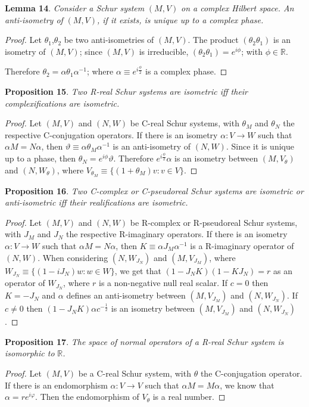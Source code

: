 \documentclass[11pt]{book}
\begin{document}
\textbf{Lemma 14}. \emph{Consider a Schur system }\((M,V)\)\emph{ on a
complex Hilbert space. An anti-isometry of }\((M,V)\)\emph{, if it
exists, is unique up to a complex phase.}

\emph{Proof.} Let \(\theta_1\),\(\theta_2\) be two anti-isometries of
\((M,V)\). The product \((\theta_2\theta_1)\) is an isometry of
\((M,V)\); since \((M,V)\) is irreducible,
\((\theta_2\theta_1)=e^{i\phi}\); with \(\phi\in \mathbb{R}\).

Therefore \(\theta_2=\alpha \theta_1\alpha^{-1}\); where
\(\alpha\equiv e^{i\frac{\phi}{2}}\) is a complex phase.~◻

\textbf{Proposition 15}. \emph{Two R-real Schur systems are isometric
iff their complexifications are isometric.}

\emph{Proof.} Let \((M,V)\) and \((N,W)\) be C-real Schur systems, with
\(\theta_M\) and \(\theta_N\) the respective C-conjugation operators. If
there is an isometry \(\alpha:V\to W\) such that \(\alpha M=N\alpha\),
then \(\vartheta\equiv \alpha\theta_M\alpha^{-1}\) is an anti-isometry
of \((N,W)\). Since it is unique up to a phase, then
\(\theta_N=e^{i\phi}\vartheta\). Therefore \(e^{i\frac{\phi}{2}}\alpha\)
is an isometry between \((M,V_\theta)\) and \((N,W_\theta)\), where
\(V_{\theta_M}\equiv\{(1+\theta_M)v: v\in V\}\).~◻

\textbf{Proposition 16}. \emph{Two C-complex or C-pseudoreal Schur
systems are isometric or anti-isometric iff their realifications are
isometric.}

\emph{Proof.} Let \((M,V)\) and \((N,W)\) be R-complex or R-pseudoreal
Schur systems, with \(J_M\) and \(J_N\) the respective R-imaginary
operators. If there is an isometry \(\alpha:V\to W\) such that
\(\alpha M=N\alpha\), then \(K\equiv \alpha J_M\alpha^{-1}\) is a
R-imaginary operator of \((N,W)\). When considering \((N,W_{J_N})\) and
\((M,V_{J_M})\), where \(W_{J_N}\equiv \{(1-iJ_N) w: w\in W\}\), we get
that \((1-J_N K)(1-K J_N)=r\) as an operator of \(W_{J_N}\), where \(r\)
is a non-negative null real scalar. If \(c=0\) then \(K=-J_N\) and
\(\alpha\) defines an anti-isometry between \((M,V_{J_M})\) and
\((N,W_{J_N})\). If \(c\neq 0\) then
\((1-J_N K)\alpha c^{-\frac{1}{2}}\) is an isometry between
\((M,V_{J_M})\) and \((N,W_{J_N})\).~◻

\textbf{Proposition 17}. \emph{The space of normal operators of a R-real
Schur system is isomorphic to }\(\mathbb{R}\)\emph{.}

\emph{Proof.} Let \((M,V)\) be a C-real Schur system, with \(\theta\)
the C-conjugation operator. If there is an endomorphism
\(\alpha:V\to V\) such that \(\alpha M=M\alpha\), we know that
\(\alpha=re^{i\varphi}\). Then the endomorphism of \(V_\theta\) is a
real number.~◻
\end{document}
